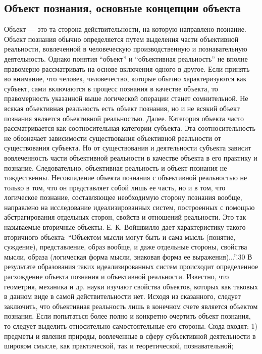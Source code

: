 \documentclass[12pt]{article}
\begin{document}
\subsection{Объект познания, основные концепции объекта}
Объект — это та сторона действительности, на которую направлено познание.
Объект познания обычно определяется путем выделения части объективной реальности, вовлеченной в
человеческую производственную и познавательную деятельность. Однако понятия “объект” и “объективная
реальность” не вполне правомерно рассматривать на основе включения одного в другое. Если принять во
внимание, что человек, человечество, которые обычно характеризуются как субъект, сами включаются в
процесс познания в качестве объекта, то правомерность указанной выше логической операции станет
сомнительной. Не всякая объективная реальность есть объект познания, но и не всякий объект познания
является объективной реальностью.
Далее. Категория объекта часто рассматривается как соотносительная категории субъекта. Эта
соотносительность не обозначает зависимости существования объективной реальности от существования
субъекта. Но от существования и деятельности субъекта зависит вовлеченность части объективной реальности в
качестве объекта в его практику и познание. Следовательно, объективная реальность и объект познания не
тождественны.
Несовпадение объекта познания с объективной реальностью не только в том, что он представляет собой лишь
ее часть, но и в том, что логическое познание, составляющее необходимую сторону познания вообще,
направлено на исследование идеализированных систем, построенных с помощью абстрагирования отдельных
сторон, свойств и отношений реальности. Это так называемые вторичные объекты. Е. К. Войшвилло дает
характеристику такого вторичного объекта: “Объектом мысли могут быть и сама мысль (понятие, суждение),
представление, образ вообще, и даже отдельные стороны, свойства мысли, образа (логическая форма мысли,
знаковая форма ее выражения)...”.30 В результате образования таких идеализированных систем происходит
определенное расхождение объекта познания и объективной реальности. Известно, что геометрия, механика и
др. науки изучают свойства объектов, которых как таковых в данном виде в самой действительности нет.
Исходя из сказанного, следует заключить, что объективная реальность лишь в конечном счете является
объектом познания. Если попытаться более полно и конкретно очертить объект познания, то следует выделить
относительно самостоятельные его стороны. Сюда входят: 1) предметы и явления природы, вовлеченные в
сферу субъективной деятельности в широком смысле, как практической, так и теоретической, познавательной;
\end{document}
